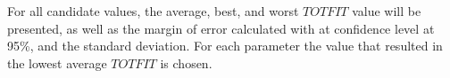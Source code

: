 For all candidate values, the average, best, and worst $TOTFIT$ value will be presented, as well as the margin of error calculated with at confidence level at 95\%, and the standard deviation. For each parameter the value that resulted in the lowest average $TOTFIT$ is chosen. 

